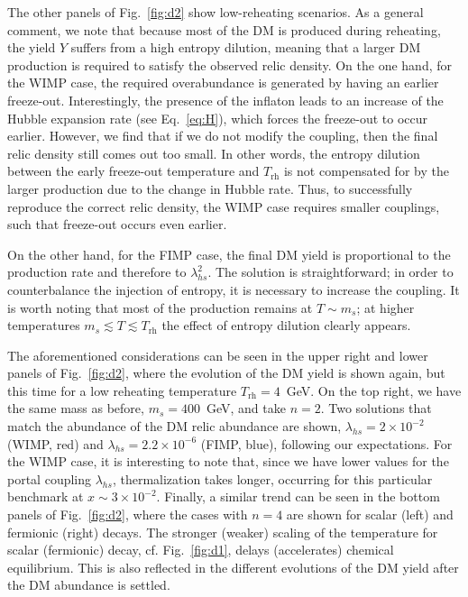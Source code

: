 \documentclass[a4paper,11pt]{article}
\newcommand{\lhs}{\lambda_{hs}}
\newcommand{\mdm}{m_s}
\newcommand{\Trh}{T_\text{rh}}
\begin{document}
The other panels of Fig.~\ref{fig:d2} show low-reheating scenarios. As a general comment, we note that because most of the DM is produced during reheating, the yield $Y$ suffers from a high entropy dilution, meaning that a larger DM production is required to satisfy the observed relic density. On the one hand, for the WIMP case, the required overabundance is generated by having an earlier freeze-out. Interestingly, the presence of the inflaton leads to an increase of the Hubble expansion rate (see Eq.~\eqref{eq:H}), which forces the freeze-out to occur earlier. However, we find that if we do not modify the coupling, then the final relic density still comes out too small. In other words, the entropy dilution between the early freeze-out temperature and $\Trh$ is not compensated for by the larger production due to the change in Hubble rate. Thus, to successfully reproduce the correct relic density, the WIMP case requires smaller couplings, such that freeze-out occurs even earlier.

On the other hand, for the FIMP case, the final DM yield is proportional to the production rate and therefore to $\lhs^2$. The solution is straightforward; in order to counterbalance the injection of entropy, it is necessary to increase the coupling. It is worth noting that most of the production remains at $T \sim \mdm$; at higher temperatures $\mdm \lesssim T \lesssim \Trh$ the effect of entropy dilution clearly appears.

The aforementioned considerations can be seen in the upper right and lower panels of Fig.~\ref{fig:d2}, where the evolution of the DM yield is shown again, but this time for a low reheating temperature $\Trh = 4$~GeV. On the top right, we have the same mass as before, $\mdm = 400$~GeV, and take $n = 2$. Two solutions that match the abundance of the DM relic abundance are shown, $\lhs = 2 \times 10^{-2}$ (WIMP, red) and $\lhs = 2.2 \times 10^{-6}$ (FIMP, blue), following our expectations. For the WIMP case, it is interesting to note that, since we have lower values for the portal coupling $\lhs$, thermalization takes longer, occurring for this particular benchmark at $x \sim 3 \times 10^{-2}$.
Finally, a similar trend can be seen in the bottom panels of Fig.~\ref{fig:d2}, where the cases with $n = 4$ are shown for scalar (left) and fermionic (right) decays.
The stronger (weaker) scaling of the temperature for scalar (fermionic) decay, cf. Fig.~\ref{fig:d1}, delays (accelerates) chemical equilibrium. This is also reflected in the different evolutions of the DM yield after the DM abundance is settled.
\end{document}
